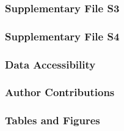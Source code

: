 \documentclass[12pt,portrait]{article}
\begin{document}
\hypertarget{supplementary-file-s3}{%
\subsubsection{Supplementary File S3}\label{supplementary-file-s3}}

\hypertarget{supplementary-file-s4}{%
\subsubsection{Supplementary File S4}\label{supplementary-file-s4}}

\hypertarget{data-accessibility}{%
\subsubsection{Data Accessibility}\label{data-accessibility}}

\hypertarget{author-contributions}{%
\subsubsection{Author Contributions}\label{author-contributions}}

\hypertarget{tables-and-figures}{%
\subsubsection{Tables and Figures}\label{tables-and-figures}}

\singlespacing
\end{document}

